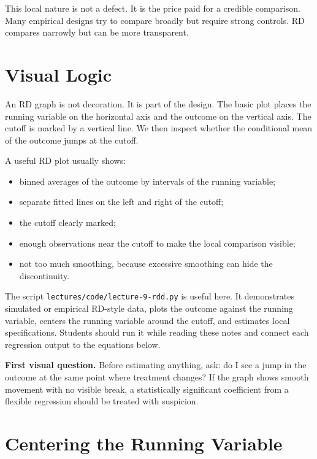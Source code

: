 This local nature is not a defect. It is the price paid for a credible comparison. Many empirical designs try to compare broadly but require strong controls. RD compares narrowly but can be more transparent.

\section{Visual Logic}

An RD graph is not decoration. It is part of the design. The basic plot places the running variable on the horizontal axis and the outcome on the vertical axis. The cutoff is marked by a vertical line. We then inspect whether the conditional mean of the outcome jumps at the cutoff.

A useful RD plot usually shows:
\begin{itemize}
    \item binned averages of the outcome by intervals of the running variable;
    \item separate fitted lines on the left and right of the cutoff;
    \item the cutoff clearly marked;
    \item enough observations near the cutoff to make the local comparison visible;
    \item not too much smoothing, because excessive smoothing can hide the discontinuity.
\end{itemize}

The script \texttt{lectures/code/lecture-9-rdd.py} is useful here. It demonstrates simulated or empirical RD-style data, plots the outcome against the running variable, centers the running variable around the cutoff, and estimates local specifications. Students should run it while reading these notes and connect each regression output to the equations below.

\begin{boxF}
\textbf{First visual question.} Before estimating anything, ask: do I see a jump in the outcome at the same point where treatment changes? If the graph shows smooth movement with no visible break, a statistically significant coefficient from a flexible regression should be treated with suspicion.
\end{boxF}

\section{Centering the Running Variable}

